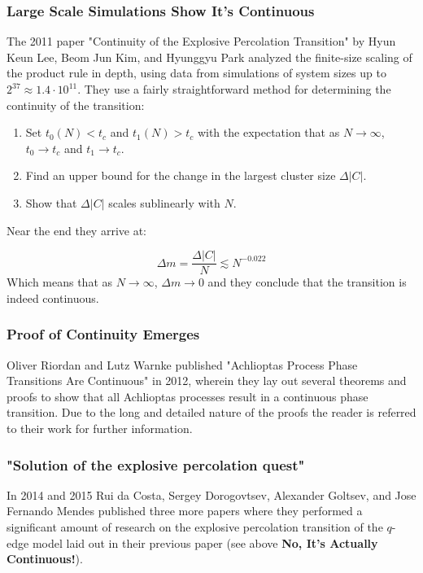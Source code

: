 \subsubsection{Large Scale Simulations Show It's Continuous}
The 2011 paper "Continuity of the Explosive Percolation Transition" \cite{Lee_1} by Hyun Keun Lee, Beom Jun Kim, and Hyunggyu Park analyzed the finite-size scaling of the product rule in depth, using data from simulations of system sizes up to $2^{37} \approx 1.4 \cdot 10^{11}$.
They use a fairly straightforward method for determining the continuity of the transition:

\begin{enumerate}
	\item Set $t_0(N) < t_c$ and $t_1(N) > t_c$ with the expectation that as $N \rightarrow \infty$, $t_0 \rightarrow t_c$ and $t_1 \rightarrow t_c$.
	\item Find an upper bound for the change in the largest cluster size $\Delta |C|$.
	\item Show that $\Delta |C|$ scales sublinearly with $N$.
\end{enumerate}

Near the end they arrive at:

\begin{equation}
	\Delta m = \frac{\Delta |C|}{N} \lesssim N^{-0.022}
\end{equation}
Which means that as $N \rightarrow \infty$, $\Delta m \rightarrow 0$ and they conclude that the transition is indeed continuous.



\subsubsection{Proof of Continuity Emerges}
Oliver Riordan and Lutz Warnke published "Achlioptas Process Phase Transitions Are
Continuous" \cite{Riordan_1} in 2012, wherein they lay out several theorems and proofs to show that all Achlioptas processes result in a continuous phase transition.
Due to the long and detailed nature of the proofs the reader is referred to their work for further information.



\subsubsection{"Solution of the explosive percolation quest"}
In 2014 and 2015 Rui da Costa, Sergey Dorogovtsev, Alexander Goltsev, and Jose Fernando Mendes published three more papers \cite{da_Costa_5, da_Costa_2, da_Costa_3} where they performed a significant amount of research on the explosive percolation transition of the $q$-edge model laid out in their previous paper (see above \textbf{No, It's Actually Continuous!}).

